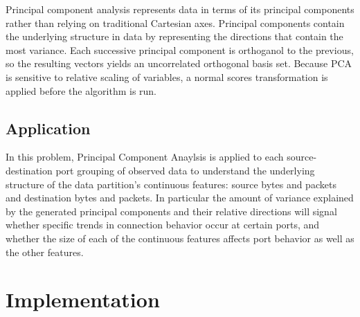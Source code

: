 \documentclass[12pt,twoside]{dukestatscithesis}
\theoremstyle{definition}
\theoremstyle{definition}
\theoremstyle{definition}
\theoremstyle{remark}
\begin{document}
Principal component analysis represents data in terms of its principal
components rather than relying on traditional Cartesian axes. Principal
components contain the underlying structure in data by representing the
directions that contain the most variance. Each successive principal
component is orthoganol to the previous, so the resulting vectors yields
an uncorrelated orthogonal basis set. Because PCA is sensitive to
relative scaling of variables, a normal scores transformation is applied
before the algorithm is run.

\subsection{Application}\label{application}

In this problem, Principal Component Anaylsis is applied to each
source-destination port grouping of observed data to understand the
underlying structure of the data partition's continuous features: source
bytes and packets and destination bytes and packets. In particular the
amount of variance explained by the generated principal components and
their relative directions will signal whether specific trends in
connection behavior occur at certain ports, and whether the size of each
of the continuous features affects port behavior as well as the other
features.

\section{Implementation}\label{implementation}
\end{document}
